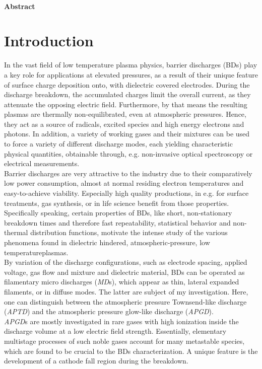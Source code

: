 \documentclass[a4paper,10pt,twoside]{article}
\newcommand{\tilt}[1]{\textit{#1}}
\begin{document}
	\begin{multicols}{2}
		\tableofcontents
	\end{multicols}
	
		\vspace{0.75cm}
	
		\paragraph{Abstract}
		
	\twocolumn

	\section{Introduction}\label{sec:intro}

		In the vast field of low temperature plasma physics, barrier discharges (BDs) play a key role for applications at elevated pressures, as a result of their unique feature of surface charge deposition onto, with dielectric covered electrodes. During the discharge breakdown, the accumulated charges limit the overall current, as they attenuate the opposing electric field. Furthermore, by that means the resulting plasmas are thermally non-equilibrated, even at atmospheric pressures. Hence, they act as a source of radicals, excited species and high energy electrons and photons. In addition, a variety of working gases and their mixtures can be used to force a variety of different discharge modes, each yielding characteristic physical quantities, obtainable through, e.g. non-invasive optical spectroscopy or electrical measurements.\\ 
		Barrier discharges are very attractive to the industry due to their comparatively low power consumption, almost at normal residing electron temperatures and easy-to-achieve viability. Especially high quality productions, in e.g. for surface treatments, gas synthesis, or in life science benefit from those properties.\\
		Specifically speaking, certain properties of BDs, like short, non-stationary breakdown times and therefore fast repeatability, statistical behavior and non-thermal distribution functions, motivate the intense study of the various phenomena found in dielectric hindered, atmospheric-pressure, low temperature\linebreak plasmas.\\
		By variation of the discharge configurations, such as electrode spacing, applied voltage, gas flow and mixture and dielectric material, BDs can be operated as filamentary micro discharges (\tilt{MD}s), which appear as thin, lateral expanded filaments, or in diffuse modes. The latter are subject of my investigation. Here, one can distinguish between the atmospheric pressure Townsend-like discharge (\tilt{APTD}) and the atmospheric pressure glow-like discharge (\tilt{APGD}).\\
		\tilt{APGD}s are mostly investigated in rare gases with high ionization inside the discharge volume at a low electric field strength. Essentially, elementary multistage processes of such noble gases account for many metastable species, which are found to be crucial to the BDs characterization. A unique feature is the development of a cathode fall region during the breakdown.
\end{document}
